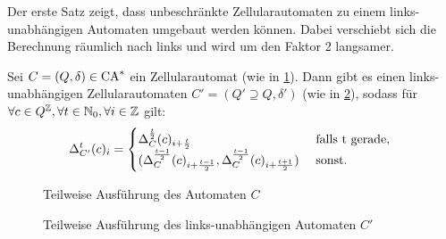 Der erste Satz zeigt, dass unbeschränkte Zellularautomaten zu einem links-un\-ab\-hän\-gi\-gen Automaten
umgebaut werden können. Dabei verschiebt sich die Berechnung räumlich nach links und wird um den Faktor 2 langsamer.
\begin{satz}
    \label{zellautoZuLinksunabhaengig}
    Sei $C = (Q, \delta) \in \textrm{CA}^*$ ein Zellularautomat (wie in \cref{fig:NormalZuRechtsUnabh}).
    Dann gibt es einen links-unabhängigen Zellularautomaten $C' = (Q' \supseteq Q, \delta')$ (wie in \cref{fig:NormalZuRechtsUnabh2}),
    sodass
    für $\forall c \in Q^{\mathbb{Z}}, \forall t \in \mathbb{N}_0, \forall i \in \mathbb{Z}$ gilt:
    \[
            \Delta_{C'}^{t}(c)_i =
            \begin{cases}
                \Delta_C^{\frac{t}{2}}(c)_{i+\frac{t}{2}} & \text{ falls } $t$ \text{ gerade, } \\
                (\Delta_C^{\frac{t - 1}{2}}(c)_{i+\frac{t - 1}{2}}, \Delta_C^{\frac{t-1}{2}}(c)_{i+\frac{t+1}{2}})  & \text{ sonst.}
            \end{cases}
    \]
        
    \begin{figure}[h!]
        \centering
        
        \caption{Teilweise Ausführung des Automaten $C$}
        \label{fig:NormalZuRechtsUnabh}
    \end{figure}
   \begin{figure}[h!]
        \centering
        
        \caption{Teilweise Ausführung des links-unabhängigen Automaten $C'$}
        \label{fig:NormalZuRechtsUnabh2}
    \end{figure}

\end{satz}
